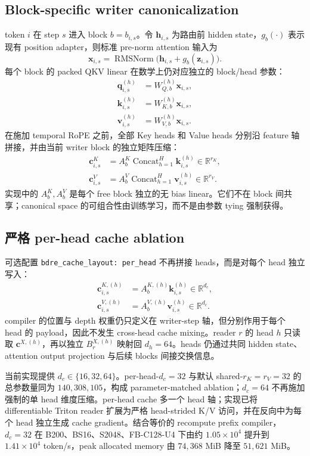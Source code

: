 \documentclass[UTF8,twocolumn,10pt,a4paper]{ctexart}
\newcommand{\Concat}{\operatorname{Concat}}
\newcommand{\code}[1]{\texttt{#1}}
\begin{document}
\subsection{Block-specific writer canonicalization}
token $i$ 在 step $s$ 进入 block $b=b_{i,s}$。令 $\bm h_{i,s}$ 为路由前 hidden state，$g_b(\cdot)$ 表示现有 position adapter，则标准 pre-norm attention 输入为
\begin{equation}
  \bm x_{i,s}=\operatorname{RMSNorm}
  \bigl(\bm h_{i,s}+g_b(\bm z_{i,s})\bigr).
\end{equation}
每个 block 的 packed QKV linear 在数学上仍对应独立的 block/head 参数：
\begin{align}
  \bm q_{i,s}^{(h)}&=W_{Q,b}^{(h)}\bm x_{i,s},\\
  \bm k_{i,s}^{(h)}&=W_{K,b}^{(h)}\bm x_{i,s},\\
  \bm v_{i,s}^{(h)}&=W_{V,b}^{(h)}\bm x_{i,s}.
\end{align}
在施加 temporal RoPE 之前，全部 Key heads 和 Value heads 分别沿 feature 轴拼接，并由当前 writer block 的独立矩阵压缩：
\begin{align}
  \bm c^K_{i,s}
  &=A^K_b\Concat_{h=1}^{H}\bm k_{i,s}^{(h)}
  \in\mathbb R^{r_K},\\
  \bm c^V_{i,s}
  &=A^V_b\Concat_{h=1}^{H}\bm v_{i,s}^{(h)}
  \in\mathbb R^{r_V}.
  \label{eq:writer-code}
\end{align}
实现中的 $A^K_b,A^V_b$ 是每个 free block 独立的无 bias linear。它们不在 block 间共享；canonical space 的可组合性由训练学习，而不是由参数 tying 强制获得。

\subsection{严格 per-head cache ablation}
可选配置 \code{bdre\_cache\_layout: per\_head} 不再拼接 heads，而是对每个 head 独立写入：
\begin{align}
  \bm c^{K,(h)}_{i,s}&=A^{K,(h)}_b\bm k^{(h)}_{i,s}
  \in\mathbb R^{d_c},\\
  \bm c^{V,(h)}_{i,s}&=A^{V,(h)}_b\bm v^{(h)}_{i,s}
  \in\mathbb R^{d_c}.
  \label{eq:per-head-writer-code}
\end{align}
compiler 的位置与 depth 权重仍只定义在 writer-step 轴，但分别作用于每个 head 的 payload，因此不发生 cross-head cache mixing。reader $r$ 的 head $h$ 只读取 $\bm c^{X,(h)}$，再以独立 $B^{X,(h)}_r$ 映射回 $d_h=64$。heads 仍通过共同 hidden state、attention output projection 与后续 blocks 间接交换信息。

当前实现提供 $d_c\in\{16,32,64\}$。per-head-$d_c=32$ 与默认 shared-$r_K=r_V=32$ 的总参数量同为 $140{,}308{,}105$，构成 parameter-matched ablation；$d_c=64$ 不再施加强制的单 head 维度压缩。per-head cache 多一个 head 轴；实现已将 differentiable Triton reader 扩展为严格 head-strided K/V 访问，并在反向中为每个 head 独立生成 cache gradient。结合等价的 recompute prefix compiler，$d_c=32$ 在 B200、BS16、S2048、FB-C128-U4 下由约 $1.05\times10^4$ 提升到 $1.41\times10^4$ token/s，peak allocated memory 由 $74{,}368$ MiB 降至 $51{,}621$ MiB。
\end{document}

